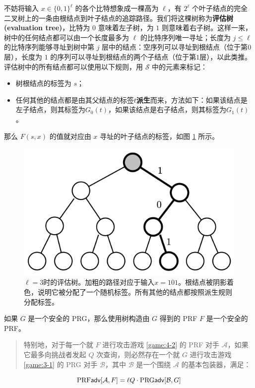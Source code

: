 不妨将输入 $x\in\{0,1\}^\ell$ 的各个比特想象成一棵高为 $\ell$，有 $2^\ell$ 个叶子结点的完全二叉树上的一条由根结点到叶子结点的追踪路径。我们将这棵树称为\textbf{评估树 (evaluation tree)}，比特为 $0$ 意味着左子树，为 $1$ 则意味着右子树。这样一来，树中的任何结点都可以由一个长度最多为 $\ell$ 的比特序列唯一寻址；长度为 $j\leq\ell$ 的比特序列能够寻址到树中第 $j$ 层中的结点：空序列可以寻址到根结点（位于第$0$层），长度为 $1$ 的序列可以寻址到根结点的两个子结点（位于第$1$层），以此类推。评估树中的所有结点都可以使用以下规则，用 $\mathcal{S}$ 中的元素来标记：
\begin{itemize}
	\item 树根结点的标签为 $s$；
	\item 任何其他的结点都是由其父结点的标签$t$\textbf{派生}而来，方法如下：如果该结点是左子结点，则其标签为$G_0(t)$，如果该结点是右子结点，则其标签为$G_1(t)$。
\end{itemize}
那么 $F(s,x)$ 的值就对应由 $x$ 寻址的叶子结点的标签，如图 \ref{fig:4-15} 所示。

\begin{figure}
  \centering
  \includegraphics[width=0.35\linewidth]{figures/chapter4/fig15.png}
  \caption{$\ell=3$时的评估树。加粗的路径对应于输入$x=101$。根结点被阴影着色，说明它被分配了一个随机标签。所有其他的结点都按照派生规则分配标签。}
  \label{fig:4-15}
\end{figure}

\begin{theorem}\label{theo:4-10}
如果 $G$ 是一个安全的 PRG，那么使用树构造由 $G$ 得到的 PRF $F$ 是一个安全的 PRF。
\begin{quote}
特别地，对于每一个就 $F$ 进行攻击游戏 \ref{game:4-2} 的 PRF 对手 $\mathcal{A}$，如果它最多向挑战者发起 $Q$ 次查询，则必然存在一个就 $G$ 进行攻击游戏 \ref{game:3-1} 的 PRG 对手 $\mathcal{B}$，其中 $\mathcal{B}$ 是一个围绕 $\mathcal{A}$ 的基本包装器，满足：
\end{quote}
\[
{\rm PRF\mathsf{adv}}[\mathcal{A},F]=\ell Q\cdot{\rm PRG\mathsf{adv}}[\mathcal{B},G]
\]
\end{theorem}

